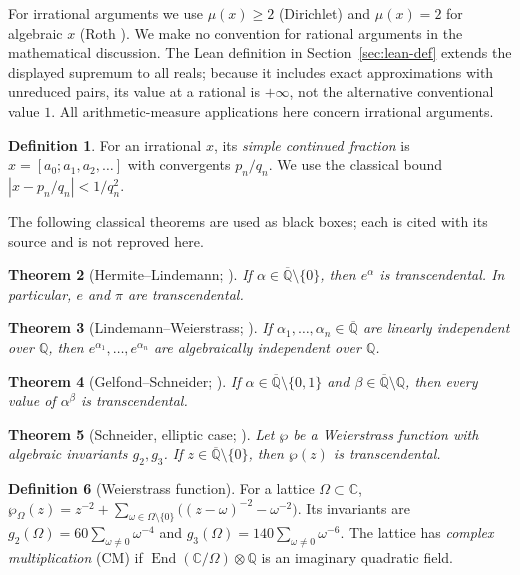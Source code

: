 \documentclass[11pt]{amsart}
\newtheorem{theorem}{Theorem}[section]
\theoremstyle{definition}
\newtheorem{definition}[theorem]{Definition}
\theoremstyle{remark}
\numberwithin{equation}{section}
\newcommand{\Q}{\mathbb{Q}}
\newcommand{\C}{\mathbb{C}}
\newcommand{\Qbar}{\overline{\mathbb{Q}}}
\newcommand{\irr}{\mu}
\newcommand{\ee}{e}
\begin{document}
For irrational arguments we use $\irr(x)\ge2$ (Dirichlet) and $\irr(x)=2$ for algebraic $x$ (Roth \cite{Roth1955}). We make no convention for rational arguments in the mathematical discussion. The Lean definition in Section~\ref{sec:lean-def} extends the displayed supremum to all reals; because it includes exact approximations with unreduced pairs, its value at a rational is $+\infty$, not the alternative conventional value $1$. All arithmetic-measure applications here concern irrational arguments.

\begin{definition}
For an irrational $x$, its \emph{simple continued fraction} is $x=[a_0;a_1,a_2,\dots]$ with convergents $p_n/q_n$. We use the classical bound $|x-p_n/q_n|<1/q_n^2$.
\end{definition}

The following classical theorems are used as black boxes; each is cited with its source and is not reproved here.

\begin{theorem}[Hermite--Lindemann; {\cite{Hermite1873,Lindemann1882}}]\label{thm:HL}
If $\alpha\in\Qbar\setminus\{0\}$, then $\ee^\alpha$ is transcendental. In particular, $\ee$ and $\pi$ are transcendental.
\end{theorem}

\begin{theorem}[Lindemann--Weierstrass; {\cite{Lindemann1882}}]\label{thm:LW}
If $\alpha_1,\dots,\alpha_n\in\Qbar$ are linearly independent over $\Q$, then $\ee^{\alpha_1},\dots,\ee^{\alpha_n}$ are algebraically independent over $\Q$.
\end{theorem}

\begin{theorem}[Gelfond--Schneider; {\cite{GS1934}}]\label{thm:GS}
If $\alpha\in\Qbar\setminus\{0,1\}$ and $\beta\in\Qbar\setminus\Q$, then every value of $\alpha^\beta$ is transcendental.
\end{theorem}

\begin{theorem}[Schneider, elliptic case; {\cite{Duke}}]\label{thm:schneider}
Let $\wp$ be a Weierstrass function with algebraic invariants $g_2,g_3$. If $z\in\Qbar\setminus\{0\}$, then $\wp(z)$ is transcendental.
\end{theorem}

\begin{definition}[Weierstrass function]
For a lattice $\Omega\subset\C$, $\wp_\Omega(z)=z^{-2}+\sum_{\omega\in\Omega\setminus\{0\}}\bigl((z-\omega)^{-2}-\omega^{-2}\bigr)$. Its invariants are $g_2(\Omega)=60\sum_{\omega\ne0}\omega^{-4}$ and $g_3(\Omega)=140\sum_{\omega\ne0}\omega^{-6}$. The lattice has \emph{complex multiplication} (CM) if $\operatorname{End}(\C/\Omega)\otimes\Q$ is an imaginary quadratic field.
\end{definition}
\end{document}
